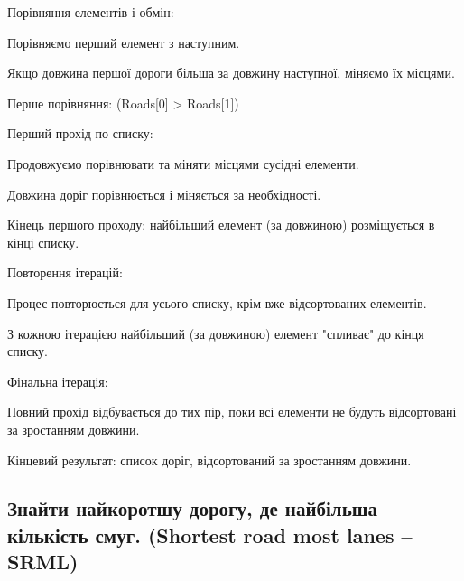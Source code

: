 \documentclass[14pt]{extarticle}
\begin{document}
\begin{firstlist}
\item Порівняння елементів і обмін:
        \begin{firstlist}
        \item Порівняємо перший елемент з наступним.
        \item Якщо довжина першої дороги більша за довжину наступної, міняємо їх місцями.
        \item Перше порівняння: (Roads[0] > Roads[1])
        \end{firstlist}

\item Перший прохід по списку:
\begin{firstlist}
    
        \item Продовжуємо порівнювати та міняти місцями сусідні елементи.
        \item Довжина доріг порівнюється і міняється за необхідності.
        \item Кінець першого проходу: найбільший елемент (за довжиною) розміщується в кінці списку.
\end{firstlist}

\item Повторення ітерацій:
\begin{firstlist}
    
        \item Процес повторюється для усього списку, крім вже відсортованих елементів.
        \item З кожною ітерацією найбільший (за довжиною) елемент "спливає" до кінця списку.
\end{firstlist}

\item Фінальна ітерація:
\begin{firstlist}
        \item Повний прохід відбувається до тих пір, поки всі елементи не будуть відсортовані за зростанням довжини.
        \item Кінцевий результат: список доріг, відсортований за зростанням довжини.
\end{firstlist}
\end{firstlist}

\subsection{Знайти найкоротшу дорогу, де найбільша кількість смуг. (Shortest road  most lanes -- SRML)}
\end{document}
